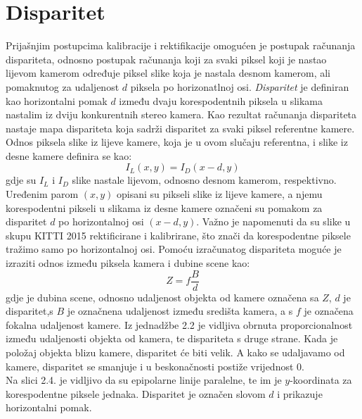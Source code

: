 \documentclass[times, utf8, zavrsni]{fer}
\begin{document}
\section{Disparitet}
Prijašnjim postupcima kalibracije i rektifikacije omogućen je postupak računanja dispariteta, odnosno postupak računanja koji za svaki piksel koji je nastao lijevom kamerom određuje piksel slike koja je nastala desnom kamerom, ali pomaknutog za udaljenost $d$ piksela po horizonatlnoj osi. \textit{Disparitet} je definiran kao horizontalni pomak $d$ između dvaju korespodentnih piksela u slikama nastalim iz dviju konkurentnih stereo kamera. Kao rezultat računanja dispariteta nastaje mapa dispariteta koja sadrži disparitet za svaki piksel referentne kamere. Odnos piksela slike iz lijeve kamere, koja je u ovom slučaju referentna, i slike iz desne kamere definira se kao: 
\begin{equation}
I_{L}(x, y) = I_{D}(x-d,y)
\label{eq:Disparitet}
\end{equation}
gdje su $I_{L}$ i $I_{D}$ slike nastale lijevom, odnosno desnom kamerom, respektivno. Uređenim parom $(x,y)$ opisani su pikseli slike iz lijeve kamere, a njemu korespodentni pikseli u slikama iz desne kamere označeni su pomakom za disparitet $d$ po horizontalnoj osi $(x-d,y)$. Važno je napomenuti da su slike u skupu KITTI 2015 rektificirane i kalibrirane, što znači da korespodentne piksele tražimo samo po horizontalnoj osi.
Pomoću izračunatog dispariteta moguće je izraziti odnos između piksela kamera i dubine scene kao:
\begin{equation}
Z=f\frac{B}{d}
\label{eq:Fokalna}
\end{equation}
gdje je dubina scene, odnosno udaljenost objekta od kamere označena sa $Z$, $d$ je disparitet,s $B$ je označnena udaljenost između središta kamera, a s $f$ je označena fokalna udaljenost kamere. Iz jednadžbe 2.2 je vidljiva obrnuta proporcionalnost između udaljenosti objekta od kamera, te dispariteta s druge strane. Kada je položaj objekta blizu kamere, disparitet će biti velik. A kako se udaljavamo od kamere, disparitet se smanjuje i u beskonačnosti postiže vrijednost 0.\\
Na slici 2.4. je vidljivo da su epipolarne linije paralelne, te im je $y$-koordinata za korespodentne piksele jednaka. Disparitet je označen slovom $d$ i prikazuje horizontalni pomak.
\end{document}
